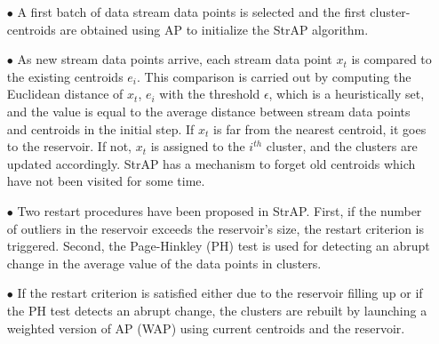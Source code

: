  






\begin{itemize}
    \item[$\bullet$] A first batch of data stream data points is selected and the first cluster-centroids are obtained using AP to initialize the StrAP algorithm.
    
    \item[$\bullet$] As new stream data points arrive,  each stream data point $x_t$ is compared to the existing centroids $e_i$. This comparison is carried out by computing the Euclidean distance of $x_t$, $e_i$ with the threshold $\epsilon$, which is a heuristically set, and the value is equal to the average distance between stream data points and centroids in the initial step. If $x_t$ is far from the nearest centroid, it goes to the reservoir. If not, $x_t$ is assigned to the $i^{th}$ cluster, and the clusters are updated accordingly. StrAP has a mechanism to forget old centroids which have not been visited for some time.
    
    \item[$\bullet$]  Two restart procedures have been proposed in StrAP. First, if the number of outliers in the reservoir exceeds the reservoir's size, the restart criterion is triggered. Second, the Page-Hinkley (PH) test is used for detecting an abrupt change in the average value of the data points in clusters. 
    
    \item[$\bullet$] If the restart criterion is satisfied either due to the reservoir filling up or if the PH test detects an abrupt change, the clusters are rebuilt by launching a weighted version of AP (WAP) using current centroids and the reservoir.
\end{itemize}

